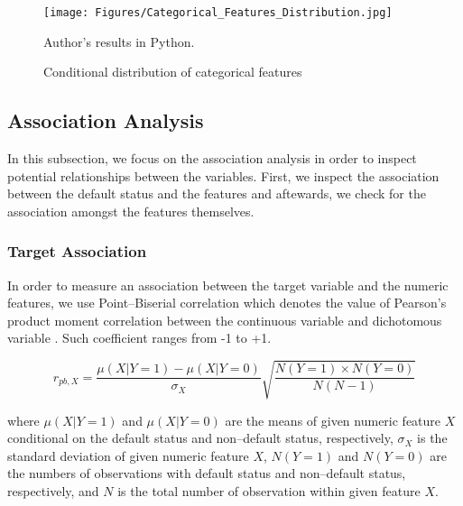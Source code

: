 \begin{figure}[H]
    \begin{center}
    \caption{Conditional distribution of categorical features}
    \label{fig:catdist}
    \texttt{[image: Figures/Categorical\_Features\_Distribution.jpg]}
\end{center}
\begin{center}
    \begin{source}Author's results in Python.\end{source}
    \end{center}
\end{figure}

\subsection{Association Analysis}
In this subsection, we focus on the association analysis in order to inspect potential relationships between the variables. First, we inspect the association between the default status and the features and aftewards, we check for the association amongst the features themselves.
\subsubsection{Target Association}

In order to measure an association between the target variable and the numeric features, we use Point--Biserial correlation which denotes the value of Pearson's product moment correlation between the continuous variable and dichotomous variable \citep{kornbrot2014point}. Such coefficient ranges from -1 to +1.

\begin{equation}\label{eq}
    r_{pb,X} =  \frac{\mu \left( X | Y=1 \right) -\mu \left( X | Y=0 \right)}{\sigma_{X}}\sqrt{\frac{N\left(Y=1\right) \times N\left(Y=0\right)}{N \left(N - 1 \right)}}
\end{equation}

where $\mu \left( X | Y=1 \right)$ and $\mu \left( X | Y=0 \right)$ are the means of given numeric feature $X$ conditional on the default status and non--default status, respectively, $\sigma_{X}$ is the standard deviation of given numeric feature $X$, $N\left(Y=1\right)$ and $N\left(Y=0\right)$ are the numbers of observations with default status and non--default status, respectively, and $N$ is the total number of observation within given feature $X$.



